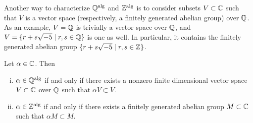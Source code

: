 Another way to characterize $\mathbb Q^{\operatorname{alg}}$ and $\mathbb Z^{\operatorname{alg}}$ is to consider subsets $V \subset \mathbb C$ such that $V$ is a vector space (respectively, a finitely generated abelian group) over $\mathbb Q$. As an example, $V = \mathbb Q$ is trivially a vector space over $\mathbb Q$, and $V = \{r + s \sqrt{-5} \mid r, s \in \mathbb Q\}$ is one as well. In particular, it contains the finitely generated abelian group $\{r + s \sqrt{-5} \mid r, s \in \mathbb Z\}$.
\begin{lemma} \label{lem:check_for_algebraic}
    Let $\alpha \in \mathbb C$. Then
    \begin{enumerate}[(i)]
        \item $\alpha \in \mathbb Q^{\operatorname{alg}}$ if and only if there exists a nonzero finite dimensional vector space $V \subset \mathbb C$ over $\mathbb Q$ such that $\alpha V \subset V$.
        \item $\alpha \in \mathbb Z^{\operatorname{alg}}$ if and only if there exists a finitely generated abelian group $M \subset \mathbb C$ such that $\alpha M \subset M$.
    \end{enumerate}
\end{lemma}
